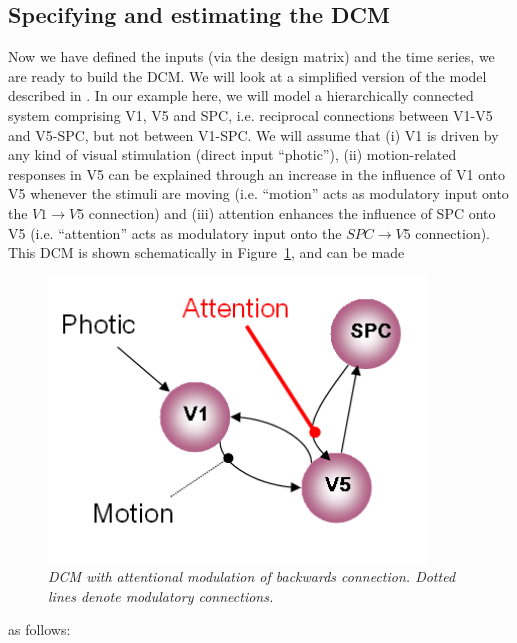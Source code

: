 \subsection{Specifying and estimating the DCM}

Now we have defined the inputs (via the design matrix) and the time series, we are ready to build the DCM. We will look at a simplified version of the model described in \cite{dcm}.  In our example here, we will model a hierarchically connected system comprising V1, V5 and SPC, i.e. reciprocal connections between V1-V5 and V5-SPC, but not between V1-SPC. We will assume that (i) V1 is driven by any kind of visual stimulation (direct input ``photic''), (ii) motion-related responses in V5 can be explained through an increase in the influence of V1 onto V5 whenever the stimuli are moving (i.e. ``motion'' acts as modulatory input onto the $V1 \rightarrow V5$ connection) and (iii) attention enhances the influence of SPC onto V5 (i.e. ``attention'' acts as modulatory input onto the $SPC \rightarrow V5$ connection). This DCM is shown schematically in Figure~\ref{bwd}, and can be made
\begin{figure}[ht]
\begin{center}
\includegraphics[width=100mm]{dcm/dcm_mod_bwd}
\caption{\em DCM with attentional modulation of backwards connection. Dotted lines denote modulatory connections.\label{bwd}}
\end{center}
\end{figure}
as follows:
